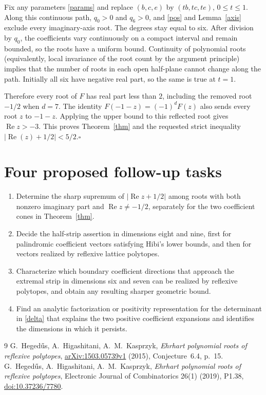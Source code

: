 \documentclass[11pt]{article}
\newcommand{\Rea}{\operatorname{Re}}
\begin{document}
Fix any parameters \eqref{params} and replace $(b,c,e)$ by
$(tb,tc,te)$, $0\le t\le1$. Along this continuous path, $q_0>0$ and
$q_6>0$, and \eqref{pos} and Lemma~\ref{axis} exclude every imaginary-axis
root. The degrees stay equal to six. After division by $q_0$, the
coefficients vary continuously on a compact interval and remain bounded,
so the roots have a uniform bound. Continuity of polynomial roots
(equivalently, local invariance of the root count by the argument
principle) implies that the number of roots in each open half-plane
cannot change along the path. Initially all six have negative real
part, so the same is true at $t=1$.

Therefore every root of $F$ has real part less than $2$, including the
removed root $-1/2$ when $d=7$. The identity
$F(-1-z)=(-1)^d F(z)$ also sends every root $z$ to $-1-z$.
Applying the upper bound to this reflected root gives $\Rea z>-3$.
This proves Theorem~\ref{thm} and the requested strict inequality
$|\Rea(z)+1/2|<5/2$.\hfill$\square$

\section*{Four proposed follow-up tasks}
\begin{enumerate}
\item[Task 2.] Determine the sharp supremum of
$|\Rea z+1/2|$ among roots with both nonzero imaginary part and
$\Rea z\ne-1/2$, separately for the two coefficient cones in
Theorem~\ref{thm}.
\item[Task 3.] Decide the half-strip assertion in dimensions eight and
nine, first for palindromic coefficient vectors satisfying Hibi's lower
bounds, and then for vectors realized by reflexive lattice polytopes.
\item[Task 4.] Characterize which boundary coefficient directions that
approach the extremal strip in dimensions six and seven can be realized
by reflexive polytopes, and obtain any resulting sharper geometric bound.
\item[Task 5.] Find an analytic factorization or positivity representation
for the determinant in \eqref{delta} that explains the two positive
coefficient expansions and identifies the dimensions in which it persists.
\end{enumerate}

\begin{thebibliography}{9}
 G.~Heged\H{u}s, A.~Higashitani, A.~M.~Kasprzyk,
\emph{Ehrhart polynomial roots of reflexive polytopes},
\href{https://arxiv.org/abs/1503.05739v1}{arXiv:1503.05739v1} (2015),
Conjecture~6.4, p.~15.
 G.~Heged\H{u}s, A.~Higashitani, A.~M.~Kasprzyk,
\emph{Ehrhart polynomial roots of reflexive polytopes},
Electronic Journal of Combinatorics 26(1) (2019), P1.38,
\href{https://doi.org/10.37236/7780}{doi:10.37236/7780}.
\end{thebibliography}
\clearpage

\end{document}
